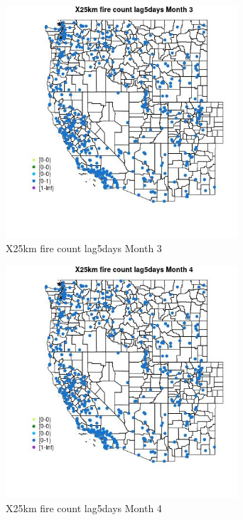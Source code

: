 \begin{figure} 
\centering  
\includegraphics[width=0.77\textwidth]{Code_Outputs/Report_ML_input_PM25_Step4_part_e_de_duplicated_aves_compiled_2019-05-14wNAs_MapObsMo3X25km_fire_count_lag5days.jpg} 
\caption{\label{fig:Report_ML_input_PM25_Step4_part_e_de_duplicated_aves_compiled_2019-05-14wNAsMapObsMo3X25km_fire_count_lag5days}X25km fire count lag5days Month 3} 
\end{figure} 
 

\begin{figure} 
\centering  
\includegraphics[width=0.77\textwidth]{Code_Outputs/Report_ML_input_PM25_Step4_part_e_de_duplicated_aves_compiled_2019-05-14wNAs_MapObsMo4X25km_fire_count_lag5days.jpg} 
\caption{\label{fig:Report_ML_input_PM25_Step4_part_e_de_duplicated_aves_compiled_2019-05-14wNAsMapObsMo4X25km_fire_count_lag5days}X25km fire count lag5days Month 4} 
\end{figure} 
 

